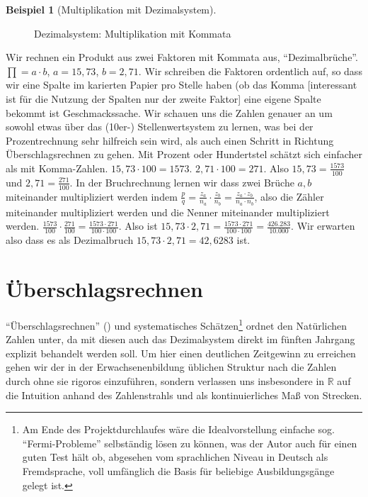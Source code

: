 \documentclass[a4paper]{book}%
\theoremstyle{definition}
\newtheorem{beispiel}{Beispiel}
\begin{document}
\begin{beispiel}[Multiplikation mit Dezimalsystem]
\begin{figure}
\begin{tikzpicture}
  \end{tikzpicture}
  \caption{Dezimalsystem: Multiplikation mit Kommata}\label{fig:Dezimalsystem02}
\end{figure}

Wir rechnen ein Produkt aus zwei Faktoren mit Kommata aus, \enquote{Dezimalbrüche}. $\prod = a \cdot b$, $a=15,73$, $b=2,71$. Wir schreiben die Faktoren ordentlich auf, so dass wir eine Spalte im karierten Papier pro Stelle haben (ob das Komma [interessant ist für die Nutzung der Spalten nur der zweite Faktor] eine eigene Spalte bekommt ist Geschmackssache. Wir schauen uns die Zahlen genauer an um sowohl etwas über das (10er-) Stellenwertsystem zu lernen, was bei der Prozentrechnung sehr hilfreich sein wird, als auch einen Schritt in Richtung Überschlagsrechnen zu gehen. Mit Prozent oder Hundertstel schätzt sich einfacher als mit Komma-Zahlen. $15,73 \cdot 100 = 1573$. $2,71 \cdot 100 = 271$. Also $15,73=\frac{1573}{100}$ und $2,71=\frac{271}{100}$. In der Bruchrechnung lernen wir dass zwei Brüche $a, b$ miteinander multipliziert werden indem $\frac{p}{q} = \frac{z_a}{n_a} \cdot \frac{z_b}{n_b} = \frac{z_a \cdot z_b}{n_a \cdot n_b}$, also die Zähler miteinander multipliziert werden und die Nenner miteinander multipliziert werden. $\frac{1573}{100} \cdot \frac{271}{100} = \frac{1573 \cdot 271}{100 \cdot 100}$. Also ist $15,73 \cdot 2,71 = \frac{1573 \cdot 271}{100 \cdot 100} = \frac{426.283}{10.000}$. Wir erwarten also dass es als Dezimalbruch $15,73 \cdot 2,71 = 42,6283$ ist.

\end{beispiel}


\chapter{Überschlagsrechnen}\label{Überschlagsrechnen}

\enquote{Überschlagsrechnen} (\citep[S. 8]{LehrplanMathematikHauptschuleHessen2017}) und systematisches Schätzen\footnote{Am Ende des Projektdurchlaufes wäre die Idealvorstellung einfache sog. \enquote{Fermi-Probleme} selbständig lösen zu können, was der Autor auch für einen guten Test hält ob, abgesehen vom sprachlichen Niveau in Deutsch als Fremdsprache, voll umfänglich die Basis für beliebige Ausbildungsgänge gelegt ist.} ordnet \citep{LehrplanMathematikHauptschuleHessen2017} den Natürlichen Zahlen unter, da mit diesen auch das Dezimalsystem direkt im fünften Jahrgang explizit behandelt werden soll. Um hier einen deutlichen Zeitgewinn zu erreichen gehen wir der in der Erwachsenenbildung üblichen Struktur nach die Zahlen durch ohne sie rigoros einzuführen, sondern verlassen uns insbesondere in $\mathbb{R}$ auf die Intuition anhand des Zahlenstrahls und als kontinuierliches Maß von Strecken.
\end{document}
